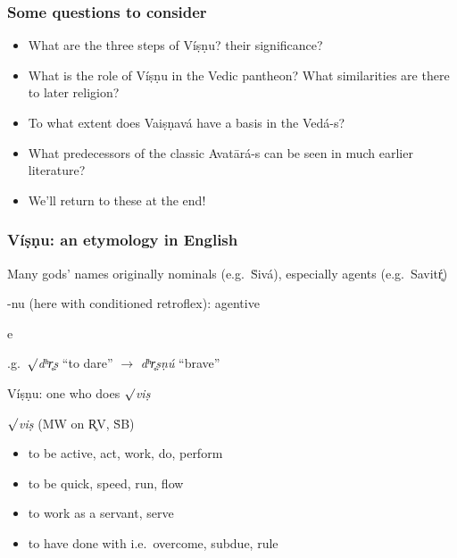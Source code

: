 \documentclass[pdf]{beamer}
\newcommand{\Subitem}[1]{{\setlength\itemindent{12pt} \item[-] #1}}
\begin{document}
\begin{frame}[label=questions] \frametitle{Some questions to consider}
\begin{itemize}
	\item What are the three steps of Víṣṇu? their significance?
	\item What is the role of Víṣṇu in the Vedic pantheon? What similarities are there to later religion?
	\item To what extent does Vaiṣṇavá have a basis in the Vedá-s?
	\item What predecessors of the classic Avatārá-s can be seen in much earlier literature?
	\item We'll return to these at the end!
\end{itemize}
\end{frame}

\begin{frame} \frametitle{Víṣṇu: an etymology in English}
\begin{itemize}
	\item Many gods' names originally nominals (e.g.~Ṡivá), especially agents (e.g.~Savitŕ̥)
	\item -nu (here with conditioned retroflex): agentive
	\Subitem e.g.~$\surd$\textit{dʰr̥ṣ} ``to dare'' $\rightarrow$ \textit{dʰr̥ṣṇú} ``brave''
	\item Víṣṇu: one who does $\surd$\textit{viṣ}
\end{itemize}

\begin{block} {$\surd$\textit{viṣ} (MW on R̥V, ṠB)}
\begin{itemize}
	\item to be active, act, work, do, perform
	\item to be quick, speed, run, flow
	\item to work as a servant, serve
	\item to have done with i.e.~overcome, subdue, rule
\end{itemize}
\end{block}
\end{frame}
\end{document}
